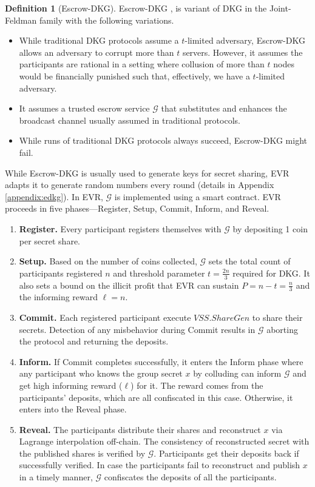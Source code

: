\documentclass[letterpaper,twocolumn,10pt]{article}
\theoremstyle{definition}
\newtheorem{definition}[theorem]{Definition}
\theoremstyle{remark}
\begin{document}
\begin{definition}[Escrow-DKG]
Escrow-DKG \cite{david2019rational}, is variant of DKG in the Joint-Feldman
family \cite{gennaro1999secure, gennaro3revisiting} with the following variations.
\begin{itemize}
    \item While traditional DKG protocols assume a $t$-limited adversary, Escrow-DKG allows an adversary to corrupt more than $t$ servers. However, it assumes the participants are rational in a setting where collusion of more than $t$ nodes would be financially punished such that, effectively, we have a $t$-limited adversary.
    \item It assumes a trusted escrow service $\mathcal{G}$ that substitutes and enhances the broadcast channel usually assumed in traditional protocols.
    \item While runs of traditional DKG protocols always succeed, Escrow-DKG might fail.
\end{itemize}
\end{definition}
While Escrow-DKG is usually used to generate keys for secret sharing, EVR adapts it to generate random numbers every round (details in Appendix \ref{appendix:edkg}). In EVR, $\mathcal{G}$ is implemented using a smart contract. EVR proceeds in five phases---Register, Setup, Commit, Inform, and Reveal.
\begin{enumerate}
    \item \textbf{Register.} Every participant registers themselves with $\mathcal{G}$ by depositing 1 coin per secret share.
    \item \textbf{Setup.}  Based on the number of coins collected, $\mathcal{G}$ sets the total count of participants registered $n$ and threshold parameter $t = \frac{2n}{3}$ required for DKG. It also sets a bound on the illicit profit that EVR can sustain $P= n-t = \frac{n}{3}$ and the informing reward $\ell = n$.
    \item \textbf{Commit.} Each registered participant execute $VSS.ShareGen$ to share their secrets. Detection of any misbehavior during Commit results in $\mathcal{G}$ aborting the protocol and returning the deposits.
     \item \textbf{Inform.} If Commit completes successfully, it enters the Inform phase where any participant who knows the group secret $x$ by colluding can inform $\mathcal{G}$ and get high informing reward ($\ell$) for it. The reward comes from the participants’ deposits, which are all confiscated in this case. Otherwise, it enters into the Reveal phase.
    \item \textbf{Reveal.} The participants distribute their shares and reconstruct $x$ via Lagrange interpolation off-chain. The consistency of reconstructed secret with the published shares is verified by $\mathcal{G}$. Participants get their deposits back if successfully verified. In case the participants fail to reconstruct and publish $x$ in a timely manner, $\mathcal{G}$ confiscates the deposits of all the participants.
\end{enumerate}
\end{document}
